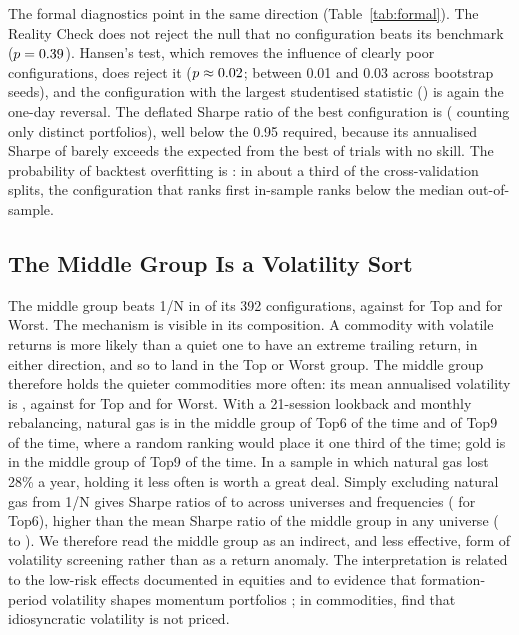 \documentclass[commodities,article,submit,pdftex,moreauthors]{Definitions/mdpi}
\begin{document}


The formal diagnostics point in the same direction (Table~\ref{tab:formal}). The Reality Check does not reject the null that no configuration beats its benchmark ($p=0.39$). Hansen's test, which removes the influence of clearly poor configurations, does reject it ($p \approx 0.02$; between 0.01 and 0.03 across bootstrap seeds), and the configuration with the largest studentised statistic (\spaT) is again the one-day reversal. The deflated Sharpe ratio of the best configuration is \dsr{} (\dsrDistinct{} counting only distinct portfolios), well below the 0.95 required, because its annualised Sharpe of \dsrSr{} barely exceeds the \dsrExpMax{} expected from the best of \nConfigs{} trials with no skill. The probability of backtest overfitting is \pbo: in about a third of the cross-validation splits, the configuration that ranks first in-sample ranks below the median out-of-sample.

\subsection{The Middle Group Is a Volatility Sort}\label{sec:median}

The middle group beats 1/N in \medBeatsEw{} of its 392 configurations, against \topBeatsEw{} for Top and \worstBeatsEw{} for Worst. The mechanism is visible in its composition. A commodity with volatile returns is more likely than a quiet one to have an extreme trailing return, in either direction, and so to land in the Top or Worst group. The middle group therefore holds the quieter commodities more often: its mean annualised volatility is \volMedian, against \volTop{} for Top and \volWorst{} for Worst. With a 21-session lookback and monthly rebalancing, natural gas is in the middle group of Top6 \ngMedSixt{} of the time and of Top9 \ngMedNine{} of the time, where a random ranking would place it one third of the time; gold is in the middle group of Top9 \goldMedNine{} of the time. In a sample in which natural gas lost 28\% a year, holding it less often is worth a great deal. Simply excluding natural gas from 1/N gives Sharpe ratios of \exNgLo{} to \exNgHi{} across universes and frequencies (\exNgSix{} for Top6), higher than the mean Sharpe ratio of the middle group in any universe (\medMeanLo{} to \medMeanHi). We therefore read the middle group as an indirect, and less effective, form of volatility screening rather than as a return anomaly. The interpretation is related to the low-risk effects documented in equities \citep{ang2006,frazzini2014} and to evidence that formation-period volatility shapes momentum portfolios \citep{fan2022}; in commodities, \citet{hollstein2021} find that idiosyncratic volatility is not priced.
\end{document}
